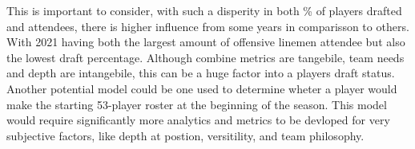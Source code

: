 \documentclass[confrence]{IEEEtran}
\begin{document}
This is important to consider, with such a disperity in both \% of players drafted and attendees, there is higher influence from some years in comparisson to others.
With 2021 having both the largest amount of offensive linemen attendee but also the lowest draft percentage. 
Although combine metrics are tangebile, team needs and depth are intangebile, this can be a huge factor into a players draft status.
Another potential model could be one used to determine wheter a player would make the starting 53-player roster at the beginning of the season.
This model would require significantly more analytics and metrics to be devloped for very subjective factors, like depth at postion, versitility, and team philosophy.

  
\end{document}
